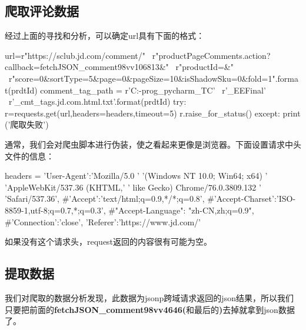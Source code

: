 \subsection{爬取评论数据}
经过上面的寻找和分析，可以确定url具有下面的格式：
\begin{python}
url=r"https://sclub.jd.com/comment/" \
    r"productPageComments.action?callback=fetchJSON_comment98vv106813&" \
    r"productId={}&" \
    r"score=0&sortType=5&page=0&pageSize=10&isShadowSku=0&fold=1".format(prdtId)
comment_tag_path = r'C:\TC-prog\JetBrain_pycharm_TC' \
                   r'\PycharmProjects\Crawler_EEFinal' \
                   r'\jd_cmt_tags\httpsitem.jd.com{}.html.txt'.format(prdtId)
try:
    r=requests.get(url,headers=headers,timeout=5)
    r.raise_for_status()
except:
    print ('爬取失败')
\end{python}
通常，我们会对爬虫脚本进行伪装，使之看起来更像是浏览器。下面设置请求中头文件的信息：
\begin{python}
headers = {'User-Agent':'Mozilla/5.0 '
                        '(Windows NT 10.0; Win64; x64) '
                        'AppleWebKit/537.36 (KHTML,'
                        ' like Gecko) Chrome/76.0.3809.132 '
                        'Safari/537.36',
#'Accept':'text/html;q=0.9,*/*;q=0.8',
#'Accept-Charset':'ISO-8859-1,utf-8;q=0.7,*;q=0.3',
#"Accept-Language": "zh-CN,zh;q=0.9",
#'Connection':'close',
'Referer':'https://www.jd.com/'
}
\end{python}
如果没有这个请求头，request返回的内容很有可能为空。

\subsection{提取数据}
我们对爬取的数据分析发现，此数据为jsonp跨域请求返回的json结果，所以我们只要把前面的\textbf{fetchJSON_comment98vv4646(}和最后的\textbf{)}去掉就拿到json数据了。

